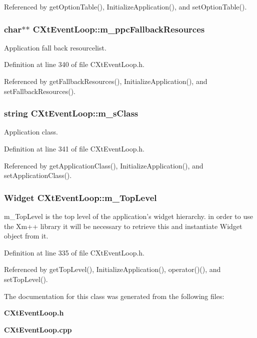 Referenced by get\-Option\-Table(), Initialize\-Application(), and set\-Option\-Table().
\subsubsection{\setlength{\rightskip}{0pt plus 5cm}char$\ast$$\ast$ CXt\-Event\-Loop::m\_\-ppc\-Fallback\-Resources\hspace{0.3cm}{\tt  [private]}}\label{classCXtEventLoop_o4}


Application fall back resourcelist.



Definition at line 340 of file CXt\-Event\-Loop.h.

Referenced by get\-Fallback\-Resources(), Initialize\-Application(), and set\-Fallback\-Resources().
\subsubsection{\setlength{\rightskip}{0pt plus 5cm}string CXt\-Event\-Loop::m\_\-s\-Class\hspace{0.3cm}{\tt  [private]}}\label{classCXtEventLoop_o5}


Application class.



Definition at line 341 of file CXt\-Event\-Loop.h.

Referenced by get\-Application\-Class(), Initialize\-Application(), and set\-Application\-Class().
\subsubsection{\setlength{\rightskip}{0pt plus 5cm}Widget CXt\-Event\-Loop::m\_\-Top\-Level\hspace{0.3cm}{\tt  [private]}}\label{classCXtEventLoop_o0}


m\_\-Top\-Level is the top level of the application's widget hierarchy. in order to use the Xm++ library it will be necessary to retrieve this and instantiate Widget object from it. 

Definition at line 335 of file CXt\-Event\-Loop.h.

Referenced by get\-Top\-Level(), Initialize\-Application(), operator()(), and set\-Top\-Level().

The documentation for this class was generated from the following files:\begin{CompactItemize}
\item 
{\bf CXt\-Event\-Loop.h}\item 
{\bf CXt\-Event\-Loop.cpp}\end{CompactItemize}
